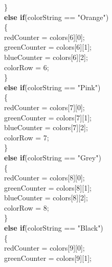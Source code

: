 \documentclass[12pt]{article}
\begin{document}
\begin{flushleft}
{\qquad \qquad \qquad \qquad \qquad				\}\\
\qquad \qquad \qquad \qquad \qquad				\textbf{else if}(colorString == "Orange")\\
\qquad \qquad \qquad \qquad \qquad				\{\\
\qquad \qquad \qquad \qquad \qquad \qquad	redCounter = colors[6][0];\\ 
\qquad \qquad \qquad \qquad \qquad \qquad	greenCounter = colors[6][1];\\
\qquad \qquad \qquad \qquad \qquad \qquad	blueCounter = colors[6][2];\\ 
\qquad \qquad \qquad \qquad \qquad \qquad		colorRow = 6;\\
\qquad \qquad \qquad \qquad \qquad				\}\\
\qquad \qquad \qquad \qquad \qquad				\textbf{else if}(colorString == "Pink")\\
\qquad \qquad \qquad \qquad \qquad				\{\\
\qquad \qquad \qquad \qquad \qquad \qquad	redCounter = colors[7][0];\\ 
\qquad \qquad \qquad \qquad \qquad \qquad					greenCounter = colors[7][1];\\
\qquad \qquad \qquad \qquad \qquad \qquad					blueCounter = colors[7][2];\\ 
\qquad \qquad \qquad \qquad \qquad \qquad					colorRow = 7;\\
\qquad \qquad \qquad \qquad \qquad				\}\\
\qquad \qquad \qquad \qquad \qquad				\textbf{else if}(colorString == "Grey")\\
\qquad \qquad \qquad \qquad \qquad				\{\\
\qquad \qquad \qquad \qquad \qquad \qquad	redCounter = colors[8][0];\\ 
\qquad \qquad \qquad \qquad \qquad \qquad					greenCounter = colors[8][1];\\
\qquad \qquad \qquad \qquad \qquad \qquad					blueCounter = colors[8][2];\\ 
\qquad \qquad \qquad \qquad \qquad \qquad					colorRow = 8;\\
\qquad \qquad \qquad \qquad \qquad				\}\\
\qquad \qquad \qquad \qquad \qquad				\textbf{else if}(colorString == "Black")\\
\qquad \qquad \qquad \qquad \qquad				\{\\
\qquad \qquad \qquad \qquad \qquad \qquad					redCounter = colors[9][0];\\ 
\qquad \qquad \qquad \qquad \qquad \qquad					greenCounter = colors[9][1];\\
}
\end{flushleft}
\end{document}
